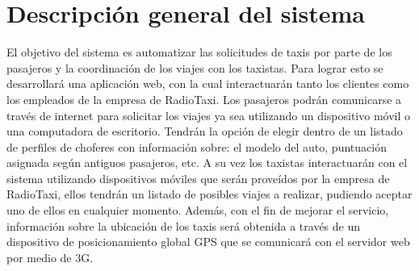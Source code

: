 
\lstset{escapechar=@,style=customc}




\fecha{\today}

\grupo{}


\maketitle

\tableofcontents
\newpage

\section{Descripción general del sistema}
El objetivo del sistema es automatizar las solicitudes de taxis por parte de los pasajeros y la coordinación de los viajes con los taxistas. Para lograr esto se desarrollará una aplicación web, con la cual interactuarán tanto los clientes como los empleados de la empresa de RadioTaxi. Los pasajeros podrán comunicarse a través de internet para solicitar los viajes ya sea utilizando un dispositivo móvil o una computadora de escritorio. Tendrán la opción de elegir dentro de un listado de perfiles de choferes con información sobre: el modelo del auto, puntuación asignada según antiguos pasajeros, etc. A su vez los taxistas interactuarán con el sistema utilizando dispositivos móviles que serán proveídos por la empresa de RadioTaxi, ellos tendrán un listado de posibles viajes a realizar, pudiendo aceptar uno de ellos en cualquier momento. Además, con el fin de mejorar el servicio, información sobre la ubicación de los taxis será obtenida a través de un dispositivo de posicionamiento global GPS que se comunicará con el servidor web por medio de 3G.

